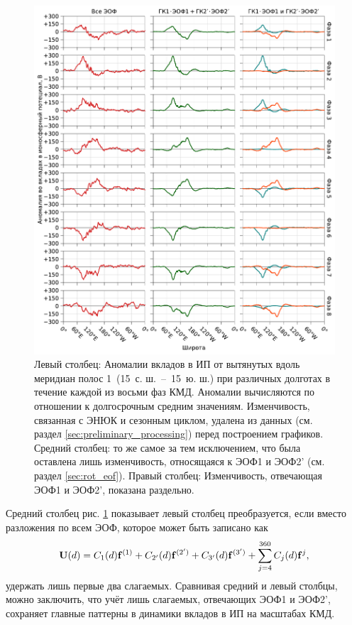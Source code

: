 \begin{figure}[htbp]
    \centering
    \includegraphics[width=\textwidth]{figures/longitudinal_structure.pdf}
    \caption{Левый столбец: Аномалии вкладов в ИП от вытянутых вдоль меридиан полос 1\textdegree{}\textdegree\ (15\textdegree\ с. ш.~--~15\textdegree\ ю. ш.) при различных долготах в течение каждой из восьми фаз КМД. Аномалии вычисляются по отношении к долгосрочным средним значениям. Изменчивость, связанная с ЭНЮК и сезонным циклом, удалена из данных (см. раздел \ref{sec:preliminary_processing}) перед построением графиков. Средний столбец: то же самое за тем исключением, что была оставлена лишь изменчивость, относящаяся к ЭОФ1 и ЭОФ2' (см. раздел \ref{sec:rot_eof}). Правый столбец: Изменчивость, отвечающая ЭОФ1 и ЭОФ2', показана раздельно.}
    \label{fig:longitudinal_structure}
\end{figure}

Средний столбец рис. \ref{fig:longitudinal_structure} показывает левый столбец преобразуется, если вместо разложения по всем ЭОФ, которое может быть записано как
\begin{equation}
    \vb{U}(d) = C_1(d) \vb{f}^{(1)} + C_{2'}(d) \vb{f}^{(2')} + C_{3'}(d) \vb{f}^{(3')} + \sum\limits_{j=4}^{360} C_j(d) \vb{f}^{j},
\end{equation}
удержать лишь первые два слагаемых. Сравнивая средний и левый столбцы, можно заключить, что учёт лишь слагаемых, отвечающих ЭОФ1 и ЭОФ2', сохраняет главные паттерны в динамики вкладов в ИП на масштабах КМД.

